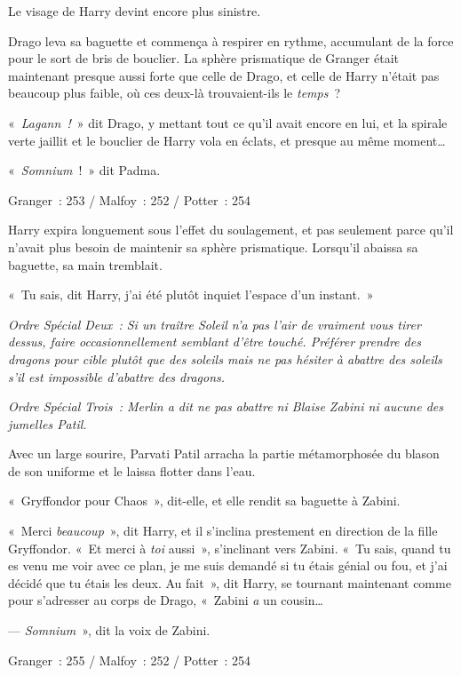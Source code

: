 Le visage de Harry devint encore plus sinistre.

Drago leva sa baguette et commença à respirer en rythme, accumulant de la force pour le sort de bris de bouclier.
La sphère prismatique de Granger était maintenant presque aussi forte que celle de Drago, et celle de Harry n'était pas beaucoup plus faible, où ces deux-là trouvaient-ils le \emph{temps}~?

«~\emph{Lagann~!}~» dit Drago, y mettant tout ce qu'il avait encore en lui, et la spirale verte jaillit et le bouclier de Harry vola en éclats, et presque au même moment…

«~\emph{Somnium}~!~»
dit Padma.

\later

Granger~: 253 / Malfoy~: 252 / Potter~: 254

Harry expira longuement sous l'effet du soulagement, et pas seulement parce qu'il n'avait plus besoin de maintenir sa sphère prismatique.
Lorsqu'il abaissa sa baguette, sa main tremblait.

«~Tu sais, dit Harry, j'ai été plutôt inquiet l'espace d'un instant.~»

\emph{Ordre Spécial Deux~: Si un traître Soleil n'a pas l'air de vraiment vous tirer dessus, faire occasionnellement semblant d'être touché.
Préférer prendre des dragons pour cible plutôt que des soleils mais ne pas hésiter à abattre des soleils s'il est impossible d'abattre des dragons.}

\emph{Ordre Spécial Trois~: Merlin a dit ne pas abattre ni Blaise Zabini ni aucune des jumelles Patil.}

Avec un large sourire, Parvati Patil arracha la partie métamorphosée du blason de son uniforme et le laissa flotter dans l'eau.

«~Gryffondor pour Chaos~», dit-elle, et elle rendit sa baguette à Zabini.

«~Merci \emph{beaucoup}~», dit Harry, et il s'inclina prestement en direction de la fille Gryffondor.
«~Et merci à \emph{toi} aussi~», s'inclinant vers Zabini.
«~Tu sais, quand tu es venu me voir avec ce plan, je me suis demandé si tu étais génial ou fou, et j'ai décidé que tu étais les deux.
Au fait~», dit Harry, se tournant maintenant comme pour s'adresser au corps de Drago, «~Zabini \emph{a} un cousin…

--- \emph{Somnium}~», dit la voix de Zabini.

\later

Granger~: 255 / Malfoy~: 252 / Potter~: 254


